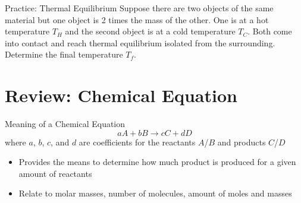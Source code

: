 \documentclass[11pt]{beamer}
\begin{document}
\begin{frame}{Practice: Thermal Equilibrium}
  Suppose there are two objects of the same material but one object is 2 times the
  mass of the other. One is at a hot temperature $T_H$ and the second object is at
  a cold temperature $T_C$. Both come into contact and reach thermal equilibrium
  isolated from the surrounding. Determine the final temperature $T_f$.
  \vspace{1.2in}
\end{frame}

\section{Review: Chemical Equation}

\begin{frame}{Meaning of a Chemical Equation}
  \begin{equation}
    aA + bB \rightarrow cC + dD
  \end{equation}
  where $a$, $b$, $c$, and $d$ are coefficients for the reactants $A$/$B$
  and products $C$/$D$
  
  \begin{itemize}
  \item Provides the means to determine how much product is
    produced for a given amount of reactants
  \item Relate to molar masses, number of molecules, amount
    of moles and masses
  \end{itemize}    
\end{frame}
\end{document}
